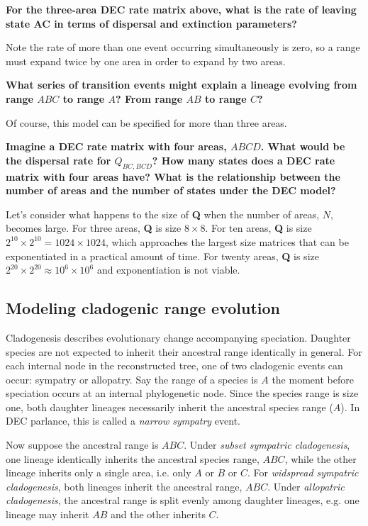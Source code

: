 {\bf {} For the three-area DEC rate matrix above, what is the rate of leaving state AC in terms of dispersal and extinction parameters?}

Note the rate of more than one event occurring simultaneously is zero, so a range must expand twice by one area in order to expand by two areas.

{\bf {} What series of transition events might explain a lineage evolving from range $ABC$ to range $A$? From range $AB$ to range $C$?}

Of course, this model can be specified for more than three areas.

{ \bf {} Imagine a DEC rate matrix with four areas, $ABCD$. What would be the dispersal rate for $Q_{BC,BCD}$? How many states does a DEC rate matrix with four areas have? What is the relationship between the number of areas and the number of states under the DEC model? }

Let's consider what happens to the size of \textbf{Q} when the number of areas, $N$, becomes large.
For three areas, \textbf{Q} is size $8 \times 8$.
For ten areas, \textbf{Q} is size $2^{10} \times 2^{10} = 1024 \times 1024$, which approaches the largest size matrices that can be exponentiated in a practical amount of time.
For twenty areas, \textbf{Q} is size $2^{20} \times 2^{20} \approx 10^6 \times 10^6$ and exponentiation is not viable.


\subsection{Modeling cladogenic range evolution}

Cladogenesis describes evolutionary change accompanying speciation.
Daughter species are not expected to inherit their ancestral range identically in general.
For each internal node in the reconstructed tree, one of two cladogenic events can occur: sympatry or allopatry.
Say the range of a species is $A$ the moment before speciation occurs at an internal phylogenetic node.
Since the species range is size one, both daughter lineages necessarily inherit the ancestral species range ($A$).
In DEC parlance, this is called a {\it narrow sympatry} event.

Now suppose the ancestral range is $ABC$.
Under {\it subset sympatric cladogenesis}, one lineage identically inherits the ancestral species range, $ABC$, while the other lineage inherits only a single area, i.e. only $A$ or $B$ or $C$.
For {\it widspread sympatric cladogenesis}, both lineages inherit the ancestral range, $ABC$.
Under {\it allopatric cladogenesis}, the ancestral range is split evenly among daughter lineages, e.g. one lineage may inherit $AB$ and the other inherits $C$.

